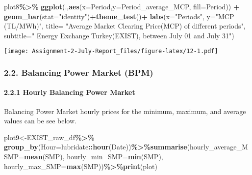 \documentclass[
]{article}
\newenvironment{Shaded}{\begin{snugshade}}{\end{snugshade}}
\newcommand{\DataTypeTok}[1]{\textcolor[rgb]{0.13,0.29,0.53}{#1}}
\newcommand{\KeywordTok}[1]{\textcolor[rgb]{0.13,0.29,0.53}{\textbf{#1}}}
\newcommand{\NormalTok}[1]{#1}
\newcommand{\OperatorTok}[1]{\textcolor[rgb]{0.81,0.36,0.00}{\textbf{#1}}}
\newcommand{\StringTok}[1]{\textcolor[rgb]{0.31,0.60,0.02}{#1}}
\begin{document}
\begin{Shaded}
\begin{Highlighting}[]
\NormalTok{plot8}\OperatorTok{\%\textgreater{}\%}\StringTok{ }\KeywordTok{ggplot}\NormalTok{(.,}\KeywordTok{aes}\NormalTok{(}\DataTypeTok{x=}\NormalTok{Period,}\DataTypeTok{y=}\NormalTok{Period\_average\_MCP, }\DataTypeTok{fill=}\NormalTok{Period)) }\OperatorTok{+}\StringTok{ }\KeywordTok{geom\_bar}\NormalTok{(}\DataTypeTok{stat=}\StringTok{"identity"}\NormalTok{)}\OperatorTok{+}\KeywordTok{theme\_test}\NormalTok{()}\OperatorTok{+}
\StringTok{    }\KeywordTok{labs}\NormalTok{(}\DataTypeTok{x=}\StringTok{"Periods"}\NormalTok{, }\DataTypeTok{y=}\StringTok{"MCP (TL/MWh)"}\NormalTok{,}
         \DataTypeTok{title=}  \StringTok{"Average Market Clearing Price(MCP) of different periods"}\NormalTok{,}
         \DataTypeTok{subtitle=}\StringTok{" Energy Exchange Turkey(EXIST), between July 01 and July 31"}\NormalTok{)}
\end{Highlighting}
\end{Shaded}

\texttt{[image: Assignment-2-July-Report\_files/figure-latex/12-1.pdf]}

\hypertarget{balancing-power-market-bpm}{%
\subsubsection{2.2. Balancing Power Market
(BPM)}\label{balancing-power-market-bpm}}

\hypertarget{hourly-balancing-power-market}{%
\paragraph{2.2.1 Hourly Balancing Power
Market}\label{hourly-balancing-power-market}}

Balancing Power Market hourly prices for the minimum, maximum, and
average values can be see below.

\begin{Shaded}
\begin{Highlighting}[]
\NormalTok{plot9\textless{}{-}EXIST\_raw\_df}\OperatorTok{\%\textgreater{}\%}\StringTok{ }\KeywordTok{group\_by}\NormalTok{(}\DataTypeTok{Hour=}\NormalTok{lubridate}\OperatorTok{::}\KeywordTok{hour}\NormalTok{(Date))}\OperatorTok{\%\textgreater{}\%}\KeywordTok{summarise}\NormalTok{(}\DataTypeTok{hourly\_average\_MSMP=}\KeywordTok{mean}\NormalTok{(SMP), }\DataTypeTok{hourly\_min\_SMP=}\KeywordTok{min}\NormalTok{(SMP), }\DataTypeTok{hourly\_max\_SMP=}\KeywordTok{max}\NormalTok{(SMP))}\OperatorTok{\%\textgreater{}\%}\KeywordTok{print}\NormalTok{(plot)}
\end{Highlighting}
\end{Shaded}
\end{document}
